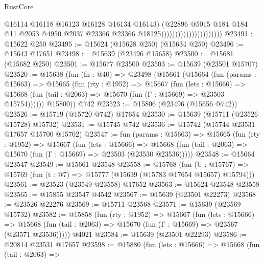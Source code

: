 \begin{lexlean}{RustCore}
\begin{coremodule}
                                                @16114
                                                @16118
                                                @16123
                                                @16128
                                                @16134
                                                @16143)
                                              (@22896
                                                @5015
                                                @184
                                                @184
                                                @11
                                                @2053
                                                @4950
                                                @2037
                                                @23366
                                                @23366
                                                @18125))))))))))))))))))))))
@23491 := @15622 @250
@23495 := @15624 (@15628 @250) (@15634 @250)
@23496 := @15643 @17651
@23498 := @15639 (@23496 @15658)
@23500 := @15681 (@15682 @250)
@23501 := @15677 @23500
@23503 := @15639 (@23501 @15707)
@23520 := @15638
    (fun (fn : @40) =>
    @23498
      (@15661
        (@15664
          (fun (params : @15663) =>
          @15665
            (fun (rty : @1952) =>
            @15667
              (fun (lets : @15666) =>
              @15668 (fun (tail : @2063) => @15670 (fun (Γ : @15669) => @23503 @15754))))))
        @15800))
    @742
@23523 := @15806 (@23496 (@15656 @742))
@23526 := @15719 (@15720 @742) @17654
@23530 := @15639 (@15711 (@23526 @15728) @15732)
@23531 := @15745 @742
@23536 := @15742 (@15744 @23531 @17657 @15700 @15702)
@23547 := fun (params : @15663) =>
  @15665
    (fun (rty : @1952) =>
    @15667
      (fun (lets : @15666) =>
      @15668 (fun (tail : @2063) => @15670 (fun (Γ : @15669) => @23503 (@23530 @23536)))))
@23548 := @15664 @23547
@23549 := @15661 @23548
@23558 := @15768
    (fun (U : @15767) => @15769 (fun (t : @7) => @15777 (@15639 (@15783 @17654 @15657) @15794)))
@23561 := @23523 (@23549 @23558) @17652
@23563 := @15624 @23548 @23558
@23565 := @15855 @23547 @4542
@23567 := @15639 (@23501 @22273)
@23568 := @23526 @22276
@23569 := @15711 @23568
@23571 := @15639 (@23569 @15732)
@23582 := @15858
    (fun (rty : @1952) =>
    @15667
      (fun (lets : @15666) =>
      @15668 (fun (tail : @2063) => @15670 (fun (Γ : @15669) => @23567 (@23571 @23536)))))
    @4021
@23584 := @15639 (@23501 @22293)
@23586 := @20814 @23531 @17657
@23598 := @15880
    (fun (lets : @15666) =>
    @15668
      (fun (tail : @2063) =>

\end{coremodule}
\end{lexlean}
